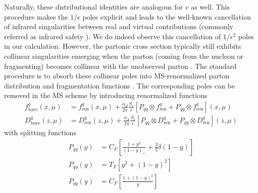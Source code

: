 Naturally, these distributional identities are analogous for $v$ as well. %
This procedure makes the $1/\epsilon$ poles explicit and leads to the well-known cancellation of infrared singularities between real and virtual contributions (commonly referred as infrared safety \cite{kinoshita_mass_1962}). We do indeed observe this cancellation of $1/\epsilon^2$ poles in our calculation. However, the partonic cross section typically still exhibits collinear singularities emerging when the parton (coming from the nucleon or fragmenting) becomes collinear with the unobserved parton \cite{hinderer_single-inclusive_2015}. The standard procedure is to absorb these collinear poles into $\overline{\text{MS}}$-renormalized parton distribution and fragmentation functions \cite{altarelli_large_1979, Collins_2011}. The corresponding poles can be removed in the $\overline{\text{MS}}$ scheme by introducing renormalized functions
\begin{equation}
\begin{aligned}
    f^q_{\text{bare}}(x,\mu)&= f^q_{\text{ren}}(x,\mu)+\frac{\alpha_S}{2\pi}\frac{S_\epsilon}{\epsilon}\left[P_{qq} \otimes f^q_{\text{ren}}+P_{qg} \otimes f^g_{\text{ren}}\right](x,\mu)\\
    D^q_{\text{bare}}(z,\mu)&= D^q_{\text{ren}}(z,\mu)+\frac{\alpha_S}{2\pi}\frac{S_\epsilon}{\epsilon}\left[P_{qq} \otimes D^q_{\text{ren}}+P_{gq} \otimes D^g_{\text{ren}}\right](z,\mu)
\end{aligned}
\end{equation}
with splitting functions
\begin{equation}
    \begin{aligned}
        P_{qq}(y)&=C_F\left[\frac{1+y^2}{(1-y)_+}+\frac{3}{2}\delta(1-y)\right]\\
        P_{qg}(y)&=T_F\left[y^2+(1-y)^2\right]\\
        P_{gq}(y)&=C_F\left[\frac{1+(1-y)^2}{y}\right]
    \end{aligned}
\end{equation}
